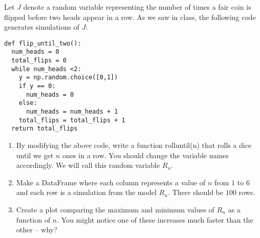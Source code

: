 \begin{exercise}
Let $J$ denote a random variable representing the number of times a fair coin is flipped before two heads appear in a row. As we saw in class, the following code generates simulations of $J$:
\begin{Verbatim}
def flip_until_two():
  num_heads = 0
  total_flips = 0
  while num_heads <2:
    y = np.random.choice([0,1])
    if y == 0:
      num_heads = 0
    else:
      num_heads = num_heads + 1
    total_flips = total_flips + 1
  return total_flips
\end{Verbatim}

\begin{enumerate}[label=(\alph*)]
\item  By modifying the above code, write a function rolluntil(n) that rolls a dice until we
get $n$ ones in a row. You should change the variable names accordingly. We will call this random variable $R_n$.
\item  Make a DataFrame where each column represents a value of $n$ from $1$ to $6$ and each row is a simulation from the model $R_n$. There should be $100$ rows.
\item Create a plot comparing the maximum and minimum values of $R_n$ as a function of $n$. You might notice one of these increases much faster than the other -- why?  
\end{enumerate}
\end{exercise}


